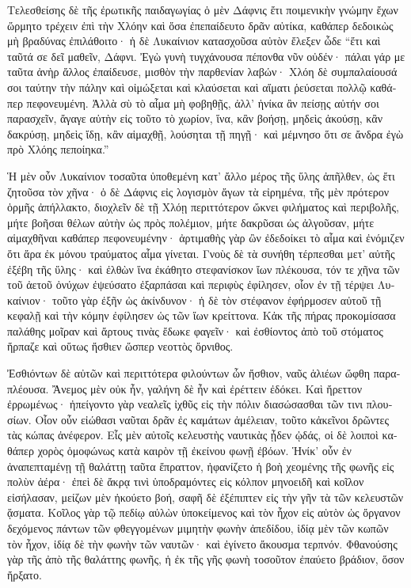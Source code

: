 \documentclass{book}
\begin{document}
\begin{pairs}
\begin{Leftside}
\begin{greek}
  Τελεσθείσης δὲ τῆς ἐρωτικῆς παιδαγωγίας ὁ μὲν Δάφνις ἔτι ποιμενικὴν γνώμην ἔχων ὥρμητο τρέχειν ἐπὶ τὴν Χλόην καὶ ὅσα ἐπεπαίδευτο δρᾶν αὐτίκα, καθάπερ δεδοικὼς μὴ βραδύνας ἐπιλάθοιτο· ἡ δὲ Λυκαίνιον κατασχοῦσα αὐτὸν ἔλεξεν ὧδε “ἔτι καὶ ταῦτά σε δεῖ μαθεῖν, Δάφνι.  Ἐγὼ γυνὴ τυγχάνουσα πέπονθα νῦν οὐδέν· πάλαι γάρ με ταῦτα ἀνὴρ ἄλλος ἐπαίδευσε, μισθὸν τὴν παρθενίαν λαβών· Χλόη δὲ συμπαλαίουσά σοι ταύτην τὴν πάλην καὶ οἰμώξεται καὶ κλαύσεται καὶ αἵματι ῥεύσεται πολλῷ καθάπερ πεφονευμένη.  Ἀλλὰ σὺ τὸ αἷμα μὴ φοβηθῇς, ἀλλ’ ἡνίκα ἂν πείσῃς αὐτήν σοι παρασχεῖν, ἄγαγε αὐτὴν εἰς τοῦτο τὸ χωρίον, ἵνα, κἂν βοήσῃ, μηδεὶς ἀκούσῃ, κἂν δακρύσῃ, μηδεὶς ἴδῃ, κἂν αἱμαχθῇ, λούσηται τῇ πηγῇ· καὶ μέμνησο ὅτι σε ἄνδρα ἐγὼ πρὸ Χλόης πεποίηκα.”
\pend


  Ἡ μὲν οὖν Λυκαίνιον τοσαῦτα ὑποθεμένη κατ’ ἄλλο μέρος τῆς ὕλης ἀπῆλθεν, ὡς ἔτι ζητοῦσα τὸν χῆνα· ὁ δὲ Δάφνις εἰς λογισμὸν ἄγων τὰ εἰρημένα, τῆς μὲν πρότερον ὁρμῆς ἀπήλλακτο, διοχλεῖν δὲ τῇ Χλόῃ περιττότερον ὤκνει φιλήματος καὶ περιβολῆς, μήτε βοῆσαι θέλων αὐτὴν ὡς πρὸς πολέμιον, μήτε δακρῦσαι ὡς ἀλγοῦσαν, μήτε αἱμαχθῆναι καθάπερ πεφονευμένην·  ἀρτιμαθὴς γὰρ ὢν ἐδεδοίκει τὸ αἷμα καὶ ἐνόμιζεν ὅτι ἄρα ἐκ μόνου τραύματος αἷμα γίνεται. Γνοὺς δὲ τὰ συνήθη τέρπεσθαι μετ’ αὐτῆς ἐξέβη τῆς ὕλης· καὶ ἐλθὼν ἵνα ἐκάθητο στεφανίσκον ἴων πλέκουσα, τόν τε χῆνα τῶν τοῦ ἀετοῦ ὀνύχων ἐψεύσατο ἐξαρπάσαι καὶ περιφὺς ἐφίλησεν, οἷον ἐν τῇ τέρψει Λυκαίνιον·  τοῦτο γὰρ ἐξῆν ὡς ἀκίνδυνον· ἡ δὲ τὸν στέφανον ἐφήρμοσεν αὐτοῦ τῇ κεφαλῇ καὶ τὴν κόμην ἐφίλησεν ὡς τῶν ἴων κρείττονα. Κἀκ τῆς πήρας προκομίσασα παλάθης μοῖραν καὶ ἄρτους τινὰς ἔδωκε φαγεῖν· καὶ ἐσθίοντος ἀπὸ τοῦ στόματος ἥρπαζε καὶ οὕτως ἤσθιεν ὥσπερ νεοττὸς ὄρνιθος.
\pend


  Ἐσθιόντων δὲ αὐτῶν καὶ περιττότερα φιλούντων ὧν ἤσθιον, ναῦς ἁλιέων ὤφθη παραπλέουσα. Ἄνεμος μὲν οὐκ ἦν, γαλήνη δὲ ἦν καὶ ἐρέττειν ἐδόκει. Καὶ ἤρεττον ἐρρωμένως· ἠπείγοντο γὰρ νεαλεῖς ἰχθῦς εἰς τὴν πόλιν διασώσασθαι τῶν τινι πλουσίων.  Οἷον οὖν εἰώθασι ναῦται δρᾶν ἐς καμάτων ἀμέλειαν, τοῦτο κἀκεῖνοι δρῶντες τὰς κώπας ἀνέφερον. Εἷς μὲν αὐτοῖς κελευστὴς ναυτικὰς ᾖδεν ᾠδάς, οἱ δὲ λοιποὶ καθάπερ χορὸς ὁμοφώνως κατὰ καιρὸν τῇ ἐκείνου φωνῇ ἐβόων.  Ἡνίκ’ οὖν ἐν ἀναπεπταμένῃ τῇ θαλάττῃ ταῦτα ἔπραττον, ἠφανίζετο ἡ βοὴ χεομένης τῆς φωνῆς εἰς πολὺν ἀέρα· ἐπεὶ δὲ ἄκρᾳ τινὶ ὑποδραμόντες εἰς κόλπον μηνοειδῆ καὶ κοῖλον εἰσήλασαν, μείζων μὲν ἠκούετο βοή, σαφῆ δὲ ἐξέπιπτεν εἰς τὴν γῆν τὰ τῶν κελευστῶν ᾅσματα.  Κοῖλος γὰρ τῷ πεδίῳ αὐλὼν ὑποκείμενος καὶ τὸν ἦχον εἰς αὑτὸν ὡς ὄργανον δεχόμενος πάντων τῶν φθεγγομένων μιμητὴν φωνὴν ἀπεδίδου, ἰδίᾳ μὲν τῶν κωπῶν τὸν ἦχον, ἰδίᾳ δὲ τὴν φωνὴν τῶν ναυτῶν· καὶ ἐγίνετο ἄκουσμα τερπνόν.  Φθανούσης γὰρ τῆς ἀπὸ τῆς θαλάττης φωνῆς, ἡ ἐκ τῆς γῆς φωνὴ τοσοῦτον ἐπαύετο βράδιον, ὅσον ἤρξατο.
\pend



\end{greek}
\end{Leftside}
\end{pairs}
\end{document}
